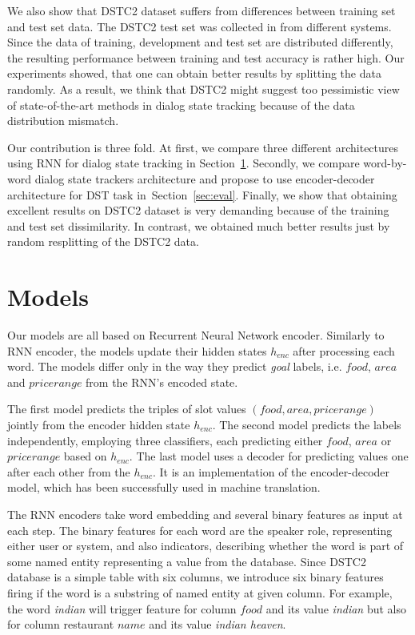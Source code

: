 \documentclass{itatnew}
\def\PB#1{\textcolor{red}{PB: \textit{#1}}}
\begin{document}
We also show that DSTC2 dataset suffers from differences between training set and test set data.
The DSTC2 test set was collected in from different systems\cite{henderson2014second}.
Since the data of training, development and test set are distributed differently, the resulting performance between training and test accuracy is rather high. 
Our experiments showed, that one can obtain better results by splitting the data randomly.
As a result, we think that DSTC2 might suggest too pessimistic view of state-of-the-art methods in dialog state tracking because of the data distribution mismatch.

Our contribution is three fold. 
At first, we compare three different architectures using RNN for dialog state tracking in Section~\ref{sec:model}.
Secondly, we compare word-by-word dialog state trackers architecture and propose to use encoder-decoder architecture for DST task in~Section~\ref{sec:eval}.
Finally, we show that obtaining excellent results on DSTC2 dataset is very demanding because of the training and test set dissimilarity. In contrast, we obtained much better results just by random resplitting of the DSTC2 data.

\section{Models}
\label{sec:model}

Our models are all based on Recurrent Neural Network encoder\cite{werbos1990backpropagation}. Similarly to RNN encoder\cite{zilka2015incremental}, the models update their hidden states $h_{enc}$ after processing each word.
The models differ only in the way they predict {\it goal} labels, i.e. $food$, $area$ and $price range$ from the RNN's encoded state.

The first model predicts the triples of slot values $(food, area, price range)$ jointly from the encoder hidden state $h_{enc}$.
The second model predicts the labels independently, employing three classifiers, each predicting either $food$, $area$ or $price range$ based on $h_{enc}$.
The last model uses a decoder for predicting values one after each other from the $h_{enc}$. It is an implementation of the encoder-decoder model, which has been successfully used in machine translation\cite{bahdanau2014neural}.

The RNN encoders take word embedding and several binary features as input at each step.
The binary features for each word are the speaker role, representing either user or system, and also indicators, describing whether the word is part of some named entity representing a value from the database.
Since DSTC2 database is a simple table with six columns, we introduce six binary features firing if the word is a substring of named entity at given column.
For example, the word {\it indian} will trigger feature for column $food$ and its value {\it indian} but also for column restaurant $name$ and its value {\it indian heaven}.
\end{document}
